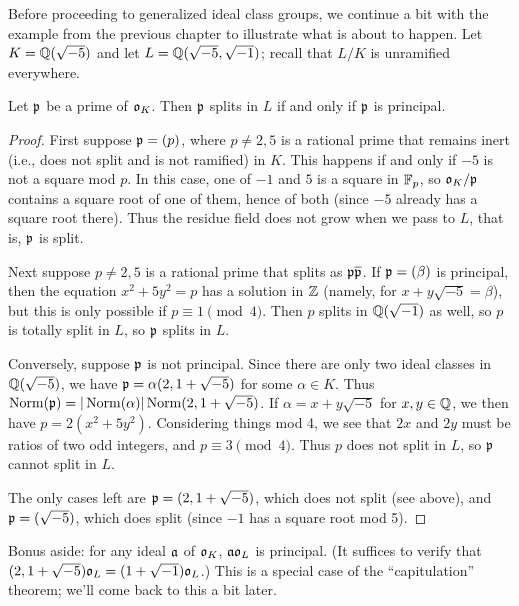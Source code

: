 Before proceeding to generalized ideal class groups, we continue a bit
with the example from the previous chapter to illustrate what is about to happen.
Let $K = \mathbb{Q}(\sqrt{-5})$ and let $L = \mathbb{Q}(\sqrt{-5}, \sqrt{-1})$; recall that
$L/K$ is unramified everywhere.
\begin{theorem}
Let $\mathfrak{p}$ be a prime of $\mathfrak{o}_K$. Then $\mathfrak{p}$ splits in $L$ if and only
if $\mathfrak{p}$ is principal.
\end{theorem}
\begin{proof}
First suppose $\mathfrak{p} = (p)$, where $p \neq 2, 5$
is a rational prime that remains inert (i.e., does not split and is not
ramified) in $K$. This happens if and only if $-5$ is not a square mod $p$.
In this case, one of $-1$ and $5$ is a square in $\mathbb{F}_p$, so
$\mathfrak{o}_K/\mathfrak{p}$ contains a square root of one of them, hence of both
(since $-5$ already has a square root there). Thus the residue field does
not grow when we pass to $L$, that is, $\mathfrak{p}$ is split.

Next suppose $p \neq 2,5$ is a rational prime that splits
as $\mathfrak{p} \overline{\mathfrak{p}}$.
If $\mathfrak{p} = (\beta)$ is principal, then
the equation $x^2 + 5y^2 = p$ has a solution in $\mathbb{Z}$
(namely, for $x + y \sqrt{-5} = \beta$), but this is only
possible if $p \equiv 1 \pmod{4}$. Then $p$ splits in $\mathbb{Q}(\sqrt{-1})$
as well, so $p$ is totally split in $L$, so
$\mathfrak{p}$ splits in $L$.

Conversely, suppose $\mathfrak{p}$ is not principal. Since there are only two
ideal classes in $\mathbb{Q}(\sqrt{-5})$, we have $\mathfrak{p} = \alpha
(2, 1 + \sqrt{-5})$ for some $\alpha \in K$. Thus
$\operatorname{Norm}(\mathfrak{p}) = |\operatorname{Norm}(\alpha)| \operatorname{Norm}(2, 1 + \sqrt{-5})$. If
$\alpha = x + y \sqrt{-5}$ for $x,y \in \mathbb{Q}$, we then have
$p = 2(x^2 + 5y^2)$. Considering things mod 4, we see that
$2x$ and $2y$ must be ratios of two odd integers, and $p \equiv 3 \pmod{4}$. Thus
$p$ does not split in $L$, so $\mathfrak{p}$ cannot split in $L$.

The only cases left are $\mathfrak{p} = (2, 1+\sqrt{-5})$, which does not split
(see above), and $\mathfrak{p} = (\sqrt{-5})$, which does split (since $-1$
has a square root mod 5).
\end{proof}

Bonus aside: for any ideal $\mathfrak{a}$ of $\mathfrak{o}_K$, $\mathfrak{a} \mathfrak{o}_L$ is
principal. (It suffices to verify that $(2, 1+\sqrt{-5})\mathfrak{o}_L =
(1+\sqrt{-1})\mathfrak{o}_L$.)
This is a special case of the ``capitulation'' theorem; we'll
come back to this a bit later.


